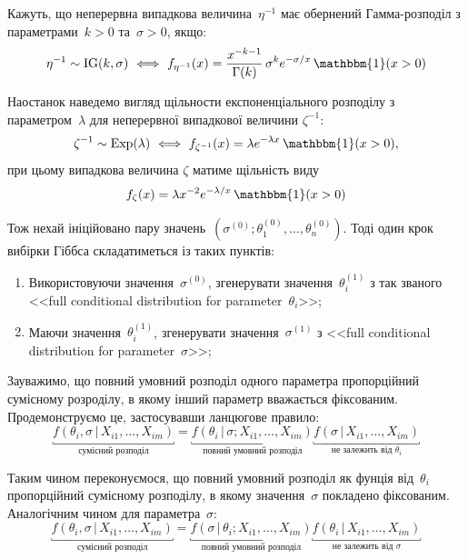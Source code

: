 Кажуть, що неперервна випадкова величина~$\eta^{-1}$ має обернений Гамма-розподіл з параметрами~$k>0$ та~$\sigma>0$, якщо:
\begin{equation}\label{task 5 - eq: dIG}
    \eta^{-1} \sim \mathrm{IG}(k,\sigma) \ \Longleftrightarrow \ f_{\eta^{-1}}(x) = \frac{x^{-k-1}}{\Gamma(k)}\,\sigma^{k} e^{-\sigma/x}\, \mathbbm{1}(x>0)
\end{equation}

Наостанок наведемо вигляд щільности експоненціального розподілу з параметром~$\lambda$ для неперервної випадкової величини $\zeta^{-1}:$
\begin{equation}\label{task 5 - eq: dExp}
    \zeta^{-1} \sim \mathrm{Exp}(\lambda) \ \Longleftrightarrow \ f_{\zeta^{-1}}(x) = \lambda e^{-\lambda x}\, \mathbbm{1}(x>0),
\end{equation}
при цьому випадкова величина $\zeta$ матиме щільність виду
\begin{equation}\label{task 5 - eq: dInvExp}
    f_{\zeta}(x) = \lambda x^{-2} e^{-\lambda/x}\, \mathbbm{1}(x>0)
\end{equation}

Тож нехай ініційовано пару значень~$\left( \sigma^{(0)};\theta_1^{(0)},\ldots,\theta_n^{(0)} \right)$. Тоді один крок вибірки Гіббса складатиметься із таких пунктів:
\begin{enumerate}
    \item Використовуючи значення~$\sigma^{(0)}$, згенерувати значення~$\theta_i^{(1)}$ з так званого <<full conditional distribution for parameter~$\theta_i$>>; 
    \item Маючи значення~$\theta_i^{(1)}$, згенерувати значення~$\sigma^{(1)}$ з <<full conditional distribution for parameter~$\sigma$>>; 
\end{enumerate}

Зауважимо, що повний умовний розподіл одного параметра пропорційний сумісному розроділу, в якому інший параметр вважається фіксованим. Продемонструємо це, застосувавши ланцюгове правило:
\begin{equation}\label{task 5 - eq: full theta conditional distribution}
    \underbracket{f(\theta_i, \sigma \,|\, X_{i1},\ldots,X_{im})}_{\text{сумісний розподіл}} = \underbracket{f(\theta_i \,|\, \sigma; X_{i1},\ldots,X_{im})}_{\text{повний умовний розподіл}} \underbracket{f(\sigma \,|\, X_{i1},\ldots,X_{im})}_{\text{не залежить від $\theta_i$}}
\end{equation}

Таким чином переконуємося, що повний умовний розподіл як фунція від~$\theta_i$ пропорційний сумісному розподілу, в якому значення~$\sigma$ покладено фіксованим. Аналогічним чином для параметра~$\sigma$:
\begin{equation}\label{task 5 - eq: full sigmaconditional distribution}
    \underbracket{f(\theta_i, \sigma \,|\, X_{i1},\ldots,X_{im})}_{\text{сумісний розподіл}} = \underbracket{f(\sigma \,|\, \theta_i; X_{i1},\ldots,X_{im})}_{\text{повний умовний розподіл}} \underbracket{f(\theta_i \,|\, X_{i1},\ldots,X_{im})}_{\text{не залежить від $\sigma$}}
\end{equation}

